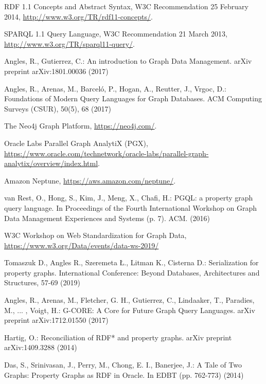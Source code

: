 \documentclass[runningheads]{llncs}
\begin{document}
%
%
%
% 
% 
%
\begin{thebibliography}{8}

RDF 1.1 Concepts and Abstract Syntax, W3C Recommendation 25 February 2014, \url{http://www.w3.org/TR/rdf11-concepts/}.

SPARQL 1.1 Query Language, W3C Recommendation 21 March 2013, \url{http://www.w3.org/TR/sparql11-query/}.

Angles, R., Gutierrez, C.: An introduction to Graph Data Management. arXiv preprint arXiv:1801.00036 (2017)

Angles, R., Arenas, M., Barceló, P., Hogan, A., Reutter, J., Vrgoc, D.: Foundations of Modern Query Languages for Graph Databases. ACM Computing Surveys (CSUR), 50(5), 68 (2017)

The Neo4j Graph Platform, \url{https://neo4j.com/}.

Oracle Labs Parallel Graph AnalytiX (PGX), \url{https://www.oracle.com/technetwork/oracle-labs/parallel-graph-analytix/overview/index.html}.

Amazon Neptune, \url{https://aws.amazon.com/neptune/}.

van Rest, O., Hong, S., Kim, J., Meng, X., Chafi, H.: PGQL: a property graph query language. In Proceedings of the Fourth International Workshop on Graph Data Management Experiences and Systems (p. 7). ACM. (2016)

W3C Workshop on Web Standardization for Graph Data, \url{https://www.w3.org/Data/events/data-ws-2019/}

Tomaszuk D., Angles R., Szeremeta Ł., Litman K., Cisterna D.:
Serialization for property graphs. International Conference: Beyond Databases, Architectures and Structures, 57-69 (2019)

Angles, R., Arenas, M., Fletcher, G. H., Gutierrez, C., Lindaaker, T., Paradies, M., ... , Voigt, H.: G-CORE: A Core for Future Graph Query Languages. arXiv preprint arXiv:1712.01550 (2017)

Hartig, O.: Reconciliation of RDF* and property graphs. arXiv preprint arXiv:1409.3288 (2014)

Das, S., Srinivasan, J., Perry, M., Chong, E. I., Banerjee, J.: A Tale of Two Graphs: Property Graphs as RDF in Oracle. In EDBT (pp. 762-773) (2014)


\end{thebibliography}
\end{document}
